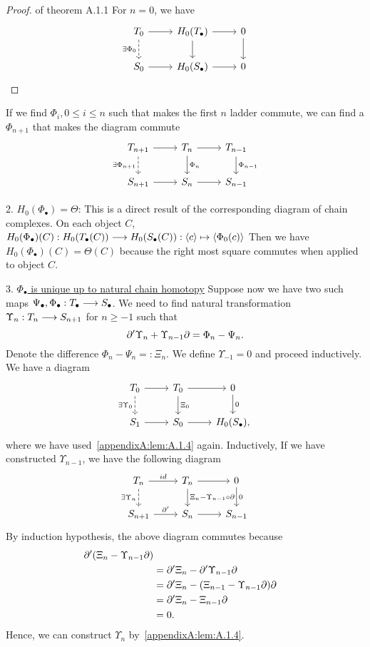 \documentclass[11pt]{book} %
\begin{document}
\begin{proposition}
\begin{proof}{of theorem A.1.1}
For $n=0$, we have
\[
\begin{tikzcd}
T_0 \arrow[r] \arrow[d, "\exists \Phi_0"', dashed] & H_0(T_\bullet) \arrow[r] \arrow[d] & 0 \arrow[d] \\
S_0 \arrow[r] & H_0(S_\bullet) \arrow[r] & 0
\end{tikzcd}
\]
\end{proof}

If we find $\Phi_i, 0\leq i\leq n$ such that makes the first $n$ ladder commute, we can find a $\Phi_{n+1}$ that makes the diagram commute
\[
\begin{tikzcd}
T_{n+1} \arrow[r] \arrow[d, "\exists \Phi_{n+1}"', dashed] & T_n \arrow[r] \arrow[d, "\Phi_n"] & T_{n-1} \arrow[d, "\Phi_{n-1}"] \\
S_{n+1} \arrow[r] & S_n \arrow[r] & S_{n-1}
\end{tikzcd}
\]

2. \underline{$H_0(\Phi_\bullet)=\Theta$}: This is a direct result of the corresponding diagram of  chain complexes. On each object $C$, $H_0(\Phi_\bullet)(C): H_0(T_\bullet(C))\longrightarrow H_0(S_\bullet(C)):\langle c\rangle\mapsto \langle \Phi_0(c)\rangle$
Then we have $H_0(\Phi_\bullet)(C)=\Theta(C)$ because the right most square commutes when applied to object $C$.

3. \underline{$\Phi_\bullet$ is unique up to natural chain homotopy} Suppose now we have two such maps $\Psi_\bullet,\Phi_\bullet: T_\bullet\longrightarrow S_\bullet$. We need to find natural transformation $\Upsilon_n: T_{n}\longrightarrow S_{n+1}$ for $n\geq -1$ such that 
$$
{\partial}'\Upsilon_n+\Upsilon_{n-1}{\partial}=\Phi_n-\Psi_n.
$$
Denote the difference $\Phi_n-\Psi_n=:\Xi_n$. We define $\Upsilon_{-1}=0$ and proceed inductively. We have a diagram
\[
\begin{tikzcd}
T_0 \arrow[r] \arrow[d, "\exists\Upsilon_0"', dashed] & T_0 \arrow[d, "\Xi_0"] \arrow[r] & 0 \arrow[d, "0"] \\
S_1 \arrow[r] & S_0 \arrow[r] & H_0(S_\bullet),
\end{tikzcd}
\]
where we have used~\ref{appendixA:lem:A.1.4} again. Inductively, If we have constructed $\Upsilon_{n-1}$, we have the following diagram
\[
\begin{tikzcd}
T_n \arrow[r, "id"] \arrow[d, "\exists \Upsilon_{n}"', dashed] & T_n \arrow[d, "\Xi_n-\Upsilon_{n-1}\circ\pd"] \arrow[r] & 0 \arrow[d, "0"] \\
S_{n+1} \arrow[r, "\pd'"] & S_n \arrow[r] & S_{n-1}
\end{tikzcd}
\] 
By induction hypothesis, the above diagram commutes because
$$
\begin{aligned}
{\partial}'(\Xi_n-\Upsilon_{n-1}{\partial})\\
&={\partial}'\Xi_n-{\partial}'\Upsilon_{n-1}{\partial}\\
&={\partial}'\Xi_n-(\Xi_{n-1}-\Upsilon_{n-1}{\partial}){\partial}\\
&={\partial}'\Xi_n-\Xi_{n-1}{\partial}\\
&=0.
\end{aligned}
$$
Hence, we can construct $\Upsilon_{n}$ by~\ref{appendixA:lem:A.1.4}.






\end{proposition}
\end{document}
